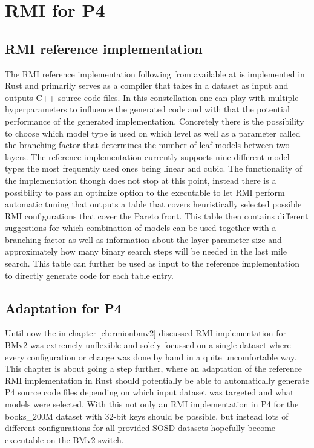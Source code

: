 
\chapter{RMI for P4}
\label{ch:rmiforp4}

\section{RMI reference implementation}
The RMI reference implementation following from \cite{cdfshop} available at \cite{rmi-reference} is implemented in Rust and primarily serves as a compiler that takes in a dataset as input and outputs C++ source code files. In this constellation one can play with multiple hyperparameters to influence the generated code and with that the potential performance of the generated implementation. Concretely there is the possibility to choose which model type is used on which level as well as a parameter called the branching factor that determines the number of leaf models between two layers. The reference implementation currently supports nine different model types the most frequently used ones being linear and cubic. The functionality of the implementation though does not stop at this point, instead there is a possibility to pass an optimize option to the executable to let RMI perform automatic tuning that outputs a table that covers heuristically selected possible RMI configurations that cover the Pareto front. This table then contains different suggestions for which combination of models can be used together with a branching factor as well as information about the layer parameter size and approximately how many binary search steps will be needed in the last mile search. This table can further be used as input to the reference implementation to directly generate code for each table entry.

\section{Adaptation for P4}
Until now the in chapter \ref{ch:rmionbmv2} discussed RMI implementation for BMv2 was extremely unflexible and solely focussed on a single dataset where every configuration or change was done by hand in a quite uncomfortable way. This chapter is about going a step further, where an adaptation of the reference RMI implementation in Rust should potentially be able to automatically generate P4 source code files depending on which input dataset was targeted and what models were selected. With this not only an RMI implementation in P4 for the books\_200M dataset with 32-bit keys should be possible, but instead lots of different configurations for all provided SOSD datasets hopefully become executable on the BMv2 switch.\\

